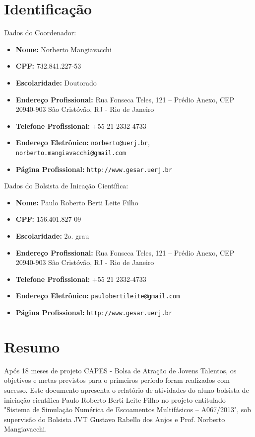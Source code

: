 \documentclass[a4paper,portuges,12pt]{article}
\begin{document}
	


\section{Identificação}

\noindent Dados do Coordenador: 
\begin{itemize}
	\item \textbf{Nome:} Norberto Mangiavacchi
	\item \textbf{CPF:} 732.841.227-53
	\item \textbf{Escolaridade:} Doutorado
	\item \textbf{Endereço Profissional:} Rua Fonseca Teles, 121 --
	Prédio Anexo, CEP 20940-903 São Cristóvão, RJ - Rio de Janeiro
	\item \textbf{Telefone Profissional:} +55 21 2332-4733
	\item \textbf{Endereço Eletrônico:} {\tt norberto@uerj.br}, 
	                                    {\tt norberto.mangiavacchi@gmail.com}
	\item \textbf{Página Profissional:} {\tt http://www.gesar.uerj.br}
\end{itemize}

\hspace{1cm}

\noindent Dados do Bolsista de Inicação Científica: 
\begin{itemize}
	\item \textbf{Nome:} Paulo Roberto Berti Leite Filho
	\item \textbf{CPF:} 156.401.827-09
	\item \textbf{Escolaridade:} 2o. grau
	\item \textbf{Endereço Profissional:} Rua Fonseca Teles, 121 --
	Prédio Anexo, CEP 20940-903 São Cristóvão, RJ - Rio de Janeiro
	\item \textbf{Telefone Profissional:} +55 21 2332-4733
	\item \textbf{Endereço Eletrônico:} {\tt paulobertileite@gmail.com}
	\item \textbf{Página Profissional:} {\tt http://www.gesar.uerj.br}
\end{itemize}

\clearpage

\section{Resumo}
Após 18 meses de projeto CAPES - Bolsa de Atração de Jovens Talentos, os
objetivos e metas previstos para o primeiros período foram realizados
com sucesso. Este documento apresenta o relatório de atividades do aluno
bolsista de iniciação científica Paulo Roberto Berti Leite Filho no
projeto entitulado "Sistema de Simulação Numérica de Escoamentos
Multifásicos -- A067/2013", sob supervisão do Bolsista JVT Gustavo
Rabello dos Anjos e Prof. Norberto Mangiavacchi. 
\clearpage
\end{document}
